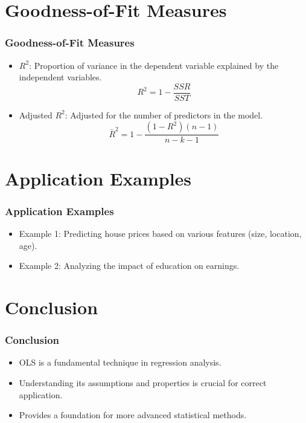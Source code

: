 \documentclass{beamer}
\begin{document}
\section{Goodness-of-Fit Measures}
\begin{frame}
    \frametitle{Goodness-of-Fit Measures}
    \begin{itemize}
        \item $R^2$: Proportion of variance in the dependent variable explained by the independent variables.
        \[
        R^2 = 1 - \frac{SSR}{SST}
        \]
        \item Adjusted $R^2$: Adjusted for the number of predictors in the model.
        \[
        \bar{R}^2 = 1 - \frac{(1 - R^2)(n - 1)}{n - k - 1}
        \]
    \end{itemize}
\end{frame}

\section{Application Examples}
\begin{frame}
    \frametitle{Application Examples}
    \begin{itemize}
        \item Example 1: Predicting house prices based on various features (size, location, age).
        \item Example 2: Analyzing the impact of education on earnings.
    \end{itemize}
\end{frame}

\section{Conclusion}
\begin{frame}
    \frametitle{Conclusion}
    \begin{itemize}
        \item OLS is a fundamental technique in regression analysis.
        \item Understanding its assumptions and properties is crucial for correct application.
        \item Provides a foundation for more advanced statistical methods.
    \end{itemize}
\end{frame}
\end{document}
